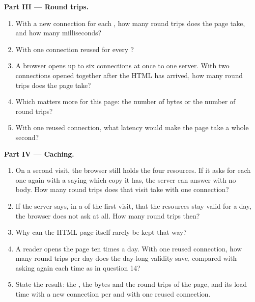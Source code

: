\begin{problem}
\medskip\noindent\textbf{Part III --- Round trips.}
\begin{enumerate}[resume]
  \item With a new connection for each , how many round trips does the page take, and how many milliseconds?
  \item With one connection reused for every ?
  \item A browser opens up to six connections at once to one server. With two connections opened together after the
    HTML has arrived, how many round trips does the page take?
  \item Which matters more for this page: the number of bytes or the number of round trips?
  \item With one reused connection, what latency would make the page take a whole second?
\end{enumerate}

\medskip\noindent\textbf{Part IV --- Caching.}
\begin{enumerate}[resume]
  \item On a second visit, the browser still holds the four resources. If it asks for each one again with a 
    saying which copy it has, the server can answer  with no body. How many round trips does
    that visit take with one connection?
  \item If the server says, in a  of the first visit, that the resources stay valid for a day, the browser
    does not ask at all. How many round trips then?
  \item Why can the HTML page itself rarely be kept that way?
  \item A reader opens the page ten times a day. With one reused connection, how many round trips per day does the
    day-long validity save, compared with asking again each time as in question 14?
  \item State the result: the , the bytes and the round trips of the page, and its load time with a new
    connection per  and with one reused connection.
\end{enumerate}
\end{problem}
